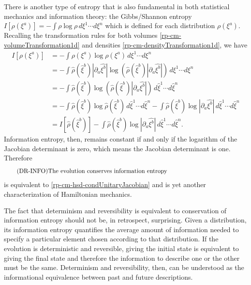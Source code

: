 There is another type of entropy that is also fundamental in both statistical mechanics and information theory: the Gibbs/Shannon entropy $I[\rho(\xi^a)]=-\int \rho \log \rho \, d\xi^1 \cdots d\xi^n$ which is defined for each distribution $\rho(\xi^a)$. Recalling the transformation rules for both volumes \ref{rp-cm-volumeTransformation1d} and densities \ref{rp-cm-densityTransformation1d}, we have
\begin{equation}
	\begin{aligned}
	I[\rho(\xi^a)] &= - \int \rho(\xi^a) \log \rho(\xi^a) \, d\xi^1 \cdots d\xi^n \\
&= - \int  \hat{\rho}(\hat{\xi}^b) \left| \partial_a \hat{\xi^b} \right| \log \left( \hat{\rho}(\hat{\xi}^b) \left| \partial_a \hat{\xi^b} \right| \right) \, d\xi^1 \cdots d\xi^n \\
&= - \int \hat{\rho}(\hat{\xi}^b) \log \left( \hat{\rho}(\hat{\xi}^b) \left| \partial_a \hat{\xi^b} \right| \right) \, d\hat{\xi}^1 \cdots d\hat{\xi}^n \\
&= - \int \hat{\rho}(\hat{\xi}^b) \log \hat{\rho}(\hat{\xi}^b) \, d\hat{\xi}^1 \cdots d\hat{\xi}^n - \int \hat{\rho}(\hat{\xi}^b) \log \left| \partial_a \hat{\xi^b} \right| \, d\hat{\xi}^1 \cdots d\hat{\xi}^n \\
&= I[\hat{\rho}(\hat{\xi}^b)] - \int \hat{\rho}(\hat{\xi}^b) \log \left| \partial_a \hat{\xi^b} \right| \, d\hat{\xi}^1 \cdots d\hat{\xi}^n.
	\end{aligned}
\end{equation}
Information entropy, then, remains constant if and only if the logarithm of the Jacobian determinant is zero, which means the Jacobian determinant is one. Therefore
\begin{equation}\label{rp-cm-hsd-condInformation}
	\tag{DR-INFO}
	\eqtext{The evolution conserves information entropy}	
\end{equation}
is equivalent to \ref{rp-cm-hsd-condUnitaryJacobian} and is yet another characterization of Hamiltonian mechanics.

The fact that determinism and reversibility is equivalent to conservation of information entropy should not be, in retrospect, surprising. Given a distribution, its information entropy quantifies the average amount of information needed to specify a particular element chosen according to that distribution. If the evolution is deterministic and reversible, giving the initial state is equivalent to giving the final state and therefore the information to describe one or the other must be the same. Determinism and reversibility, then, can be understood as the informational equivalence between past and future descriptions.

